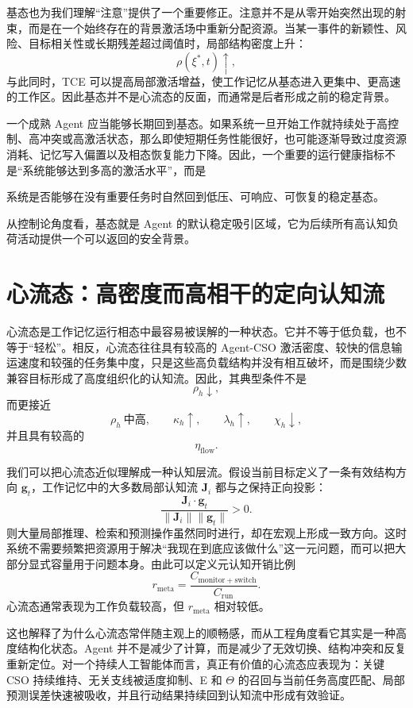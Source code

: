 基态也为我们理解“注意”提供了一个重要修正。注意并不是从零开始突然出现的射束，而是在一个始终存在的背景激活场中重新分配资源。当某一事件的新颖性、风险、目标相关性或长期残差超过阈值时，局部结构密度上升：
\[
\rho(\xi^\ast,t)\uparrow,
\]
与此同时，TCE 可以提高局部激活增益，使工作记忆从基态进入更集中、更高速的工作区。因此基态并不是心流态的反面，而通常是后者形成之前的稳定背景。

一个成熟 Agent 应当能够长期回到基态。如果系统一旦开始工作就持续处于高控制、高冲突或高激活状态，那么即使短期任务性能很好，也可能逐渐导致过度资源消耗、记忆写入偏置以及相态恢复能力下降。因此，一个重要的运行健康指标不是“系统能够达到多高的激活水平”，而是
\begin{statementbox}
系统是否能够在没有重要任务时自然回到低压、可响应、可恢复的稳定基态。
\end{statementbox}
从控制论角度看，基态就是 Agent 的默认稳定吸引区域，它为后续所有高认知负荷活动提供一个可以返回的安全背景。

\section{心流态：高密度而高相干的定向认知流}

心流态是工作记忆运行相态中最容易被误解的一种状态。它并不等于低负载，也不等于“轻松”。相反，心流态往往具有较高的 Agent-CSO 激活密度、较快的信息输运速度和较强的任务集中度，只是这些高负载结构并没有相互破坏，而是围绕少数兼容目标形成了高度组织化的认知流。因此，其典型条件不是
\[
\rho_h\downarrow,
\]
而更接近
\[
\rho_h\ \text{中高},\qquad
\kappa_h\uparrow,\qquad
\lambda_h\uparrow,\qquad
\chi_h\downarrow,
\]
并且具有较高的
\[
\eta_{\mathrm{flow}}.
\]

我们可以把心流态近似理解成一种认知层流。假设当前目标定义了一条有效结构方向 $\mathbf g_t$，工作记忆中的大多数局部认知流 $\mathbf J_i$ 都与之保持正向投影：
\[
\frac{
\mathbf J_i\cdot\mathbf g_t
}{
\|\mathbf J_i\|\|\mathbf g_t\|
}
>0.
\]
则大量局部推理、检索和预测操作虽然同时进行，却在宏观上形成一致方向。这时系统不需要频繁把资源用于解决“我现在到底应该做什么”这一元问题，而可以把大部分显式容量用于问题本身。由此可以定义元认知开销比例
\[
r_{\mathrm{meta}}
=
\frac{
C_{\mathrm{monitor+switch}}
}{
C_{\mathrm{run}}
}.
\]
心流态通常表现为工作负载较高，但 $r_{\mathrm{meta}}$ 相对较低。

这也解释了为什么心流态常伴随主观上的顺畅感，而从工程角度看它其实是一种高度结构化状态。Agent 并不是减少了计算，而是减少了无效切换、结构冲突和反复重新定位。对一个持续人工智能体而言，真正有价值的心流态应表现为：关键 CSO 持续维持、无关支线被适度抑制、E 和 $\Theta$ 的召回与当前任务高度匹配、局部预测误差快速被吸收，并且行动结果持续回到认知流中形成有效验证。

